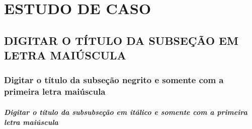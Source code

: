 \chapter{ESTUDO DE CASO}\label{cap:ch3}  



\section{DIGITAR O TÍTULO DA SUBSEÇÃO EM LETRA MAIÚSCULA}\label{sec:ch3.1}



\subsection{\textbf{Digitar o título da subseção negrito e somente com a primeira letra maiúscula}}\label{subsec:ch3.1.1}



\subsubsection{\textit{Digitar o título da subsubseção em itálico e somente com a primeira letra maiúscula}}\label{subsubsec:ch3.1.1.1}

